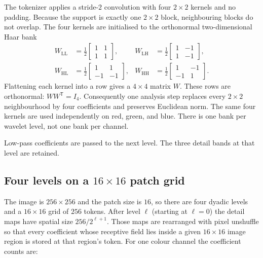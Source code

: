 \documentclass[11pt]{article}
\begin{document}
The tokenizer applies a stride-$2$ convolution with four $2\times2$ kernels
and no padding. Because the support is exactly one $2\times2$ block, neighbouring
blocks do not overlap. The four kernels are initialised to the orthonormal
two-dimensional Haar bank
\begin{equation}
\begin{aligned}
W_{\mathrm{LL}} &= \tfrac12\begin{bmatrix} 1 & 1 \\ 1 & 1 \end{bmatrix}, &
W_{\mathrm{LH}} &= \tfrac12\begin{bmatrix} 1 & -1 \\ 1 & -1 \end{bmatrix}, \\[4pt]
W_{\mathrm{HL}} &= \tfrac12\begin{bmatrix} 1 & 1 \\ -1 & -1 \end{bmatrix}, &
W_{\mathrm{HH}} &= \tfrac12\begin{bmatrix} 1 & -1 \\ -1 & 1 \end{bmatrix}.
\end{aligned}
\end{equation}
Flattening each kernel into a row gives a $4\times4$ matrix $W$. These rows
are orthonormal: $WW^{\mathsf T}=I_4$. Consequently one analysis step replaces
every $2\times2$ neighbourhood by four coefficients and preserves Euclidean
norm. The same four kernels are used independently on red, green, and blue.
There is one bank per wavelet level, not one bank per channel.

Low-pass coefficients are passed to the next level. The three detail bands at
that level are retained.

\subsection{Four levels on a $16\times16$ patch grid}

The image is $256\times256$ and the patch size is $16$, so there are four
dyadic levels and a $16\times16$ grid of $256$ tokens. After level $\ell$
(starting at $\ell=0$) the detail maps have spatial size $256/2^{\ell+1}$.
Those maps are rearranged with pixel unshuffle so that every coefficient whose
receptive field lies inside a given $16\times16$ image region is stored at that
region's token. For one colour channel the coefficient counts are:
\end{document}
